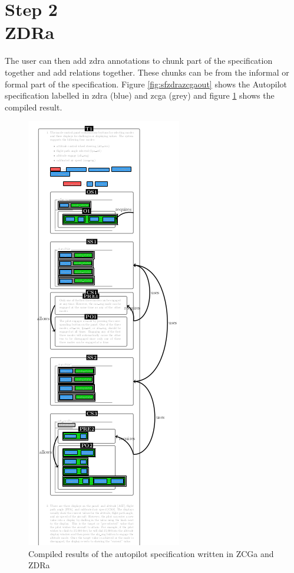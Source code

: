  \section{Step 2\\ZDRa}

 The user can then add \gls{zdra} annotations to chunk part of the specification
together and add relations together. These chunks can be from the informal or
formal part of the specification. Figure \ref{fig:sfzdrazcgaout} shows the Autopilot
specification labelled in \gls{zdra} (blue) and \gls{zcga} (grey) and figure
\ref{fig:sfcompzcgazdra} shows the compiled result.

\begin{figure}[H]
\centering
\includegraphics[scale=0.6]{Figures/fullexample/sfzdracorrectout.png}
\caption{Compiled results of the autopilot specification written in ZCGa and ZDRa \label{fig:sfcompzcgazdra}}
\end{figure}

